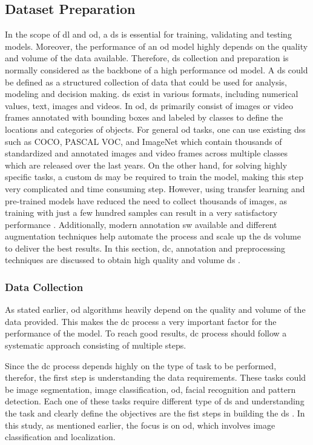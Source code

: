 \subsection{Dataset Preparation}
In the scope of \gls{dl} and \gls{od}, a \gls{ds} is essential for training, validating and testing models. Moreover, the performance of an \gls{od} model highly depends on the quality and volume of the data available. Therefore, \gls{ds} collection and preparation is normally considered as the backbone of a high performance \gls{od} model. A \gls{ds} could be defined as a structured collection of data that could be used for analysis, modeling and decision making. \gls{ds} exist in various formats, including numerical values, text, images and videos. In \gls{od}, \gls{ds} primarily consist of images or video frames annotated with bounding boxes and labeled by classes to define the locations and categories of objects. For general \gls{od} tasks, one can use existing \gls{ds}s such as COCO, PASCAL VOC, and ImageNet which contain thousands of standardized and annotated images and video frames across multiple classes which are released over the last years. On the other hand, for solving highly specific tasks, a custom \gls{ds} may be required to train the model, making this step very complicated and time consuming step. However, using transfer learning and pre-trained models have reduced the need to collect thousands of images, as training with just a few hundred samples can result in a very satisfactory performance \cite{IBM_Transfer_Learning}. Additionally, modern annotation \gls{sw} available and different augmentation techniques help automate the process and scale up the \gls{ds} volume to deliver the best results. In this section, \gls{dc}, annotation and preprocessing techniques are discussed to obtain high quality and volume \gls{ds} \cite{oD_Review}.

\subsubsection{Data Collection}
As stated earlier, \gls{od} algorithms heavily depend on the quality and volume of the data provided. This makes the \gls{dc} process a very important factor for the performance of the model. To reach good results, \gls{dc} process should follow a systematic approach consisting of multiple steps.

Since the \gls{dc} process depends highly on the type of task to be performed, therefor, the first step is understanding the data requirements. These tasks could be image segmentation, image classification, \gls{od}, facial recognition and pattern detection. Each one of these tasks require different type of \gls{ds} and understanding the task and clearly define the objectives are the fist steps in building the \gls{ds} \cite{AIMultiple_Computer_Vision_Training_Data}. In this study, as mentioned earlier, the focus is on \gls{od}, which involves image classification and localization.


